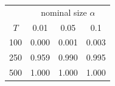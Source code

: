 % 
\begin{tabular}{cccc}
  \hline
  & \multicolumn{3}{c}{nominal size $\alpha$} \\
 $T$ & 0.01 & 0.05 & 0.1 \\
 \hline
100 & 0.000 & 0.001 & 0.003 \\ 
  250 & 0.959 & 0.990 & 0.995 \\ 
  500 & 1.000 & 1.000 & 1.000 \\ 
   \hline
\end{tabular}
